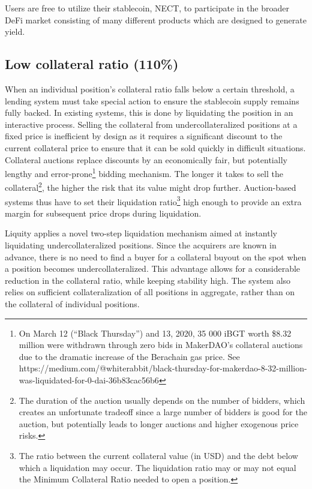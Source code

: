 \documentclass{article}
\begin{document}
Users are free to utilize their stablecoin, NECT, to participate in the broader DeFi market consisting of many different products which are designed to generate yield.

\subsection{Low collateral ratio (110\%)}
When an individual position’s collateral ratio falls below a certain threshold, a lending system must take special action to ensure the stablecoin supply remains fully backed. In existing systems, this is done by liquidating the position in an interactive process. Selling the collateral from undercollateralized positions at a fixed price is inefficient by design as it requires a significant discount to the current collateral price to ensure that it can be sold quickly in difficult situations. Collateral auctions replace discounts by an economically fair, but potentially lengthy and error-prone\footnote{On March 12 (“Black Thursday”) and 13, 2020, 35 000 iBGT worth \$8.32 million were withdrawn through zero bids in MakerDAO’s collateral auctions due to the dramatic increase of the Berachain gas price. See https://medium.com/@whiterabbit/black-thursday-for-makerdao-8-32-million-was-liquidated-for-0-dai-36b83cac56b6} bidding mechanism. The longer it takes to sell the collateral\footnote{The duration of the auction usually depends on the number of bidders, which creates an unfortunate tradeoff since a large number of bidders is good for the auction, but potentially leads to longer auctions and higher exogenous price risks.}, the higher the risk that its value might drop further. Auction-based systems thus have to set their liquidation ratio\footnote{The ratio between the current collateral value (in USD) and the debt below which a liquidation may occur. The liquidation ratio may or may not equal the Minimum Collateral Ratio needed to open a position.} high enough to provide an extra margin for subsequent price drops during liquidation.

Liquity applies a novel two-step liquidation mechanism aimed at instantly liquidating undercollateralized positions. Since the acquirers are known in advance, there is no need to find a buyer for a collateral buyout on the spot when a position becomes undercollateralized. This advantage allows for a considerable reduction in the collateral ratio, while keeping stability high. The system also relies on sufficient collateralization of all positions in aggregate, rather than on the collateral of individual positions.
\end{document}
